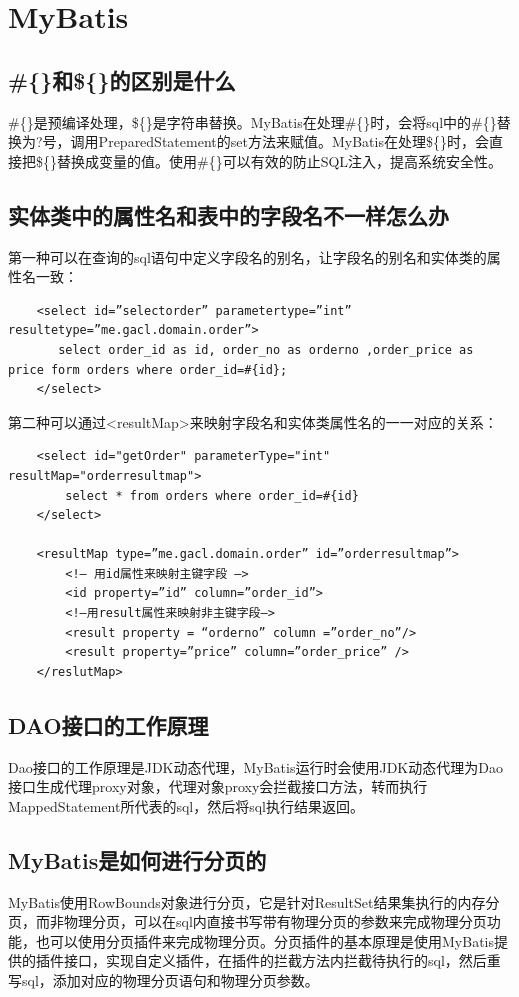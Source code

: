 \documentclass[main.tex]{subfiles}
\begin{document}
\section{MyBatis}
\subsection{\#\{\}和\$\{\}的区别是什么}
\#\{\}是预编译处理，\$\{\}是字符串替换。MyBatis在处理\#\{\}时，会将sql中的\#\{\}替换为?号，调用PreparedStatement的set方法来赋值。MyBatis在处理\$\{\}时，会直接把\$\{\}替换成变量的值。使用\#\{\}可以有效的防止SQL注入，提高系统安全性。

\subsection{实体类中的属性名和表中的字段名不一样怎么办}
第一种可以在查询的sql语句中定义字段名的别名，让字段名的别名和实体类的属性名一致：
\begin{verbatim}
    <select id=”selectorder” parametertype=”int” resultetype=”me.gacl.domain.order”>
       select order_id as id, order_no as orderno ,order_price as price form orders where order_id=#{id};
    </select>
\end{verbatim}
第二种可以通过<resultMap>来映射字段名和实体类属性名的一一对应的关系：
\begin{verbatim}
    <select id="getOrder" parameterType="int" resultMap="orderresultmap">
        select * from orders where order_id=#{id}
    </select>

    <resultMap type=”me.gacl.domain.order” id=”orderresultmap”>
        <!– 用id属性来映射主键字段 –>
        <id property=”id” column=”order_id”>
        <!–用result属性来映射非主键字段–>
        <result property = “orderno” column =”order_no”/>
        <result property=”price” column=”order_price” />
    </reslutMap>
\end{verbatim}

\subsection{DAO接口的工作原理}
Dao接口的工作原理是JDK动态代理，MyBatis运行时会使用JDK动态代理为Dao接口生成代理proxy对象，代理对象proxy会拦截接口方法，转而执行MappedStatement所代表的sql，然后将sql执行结果返回。

\subsection{MyBatis是如何进行分页的}
MyBatis使用RowBounds对象进行分页，它是针对ResultSet结果集执行的内存分页，而非物理分页，可以在sql内直接书写带有物理分页的参数来完成物理分页功能，也可以使用分页插件来完成物理分页。分页插件的基本原理是使用MyBatis提供的插件接口，实现自定义插件，在插件的拦截方法内拦截待执行的sql，然后重写sql，添加对应的物理分页语句和物理分页参数。
\end{document}

